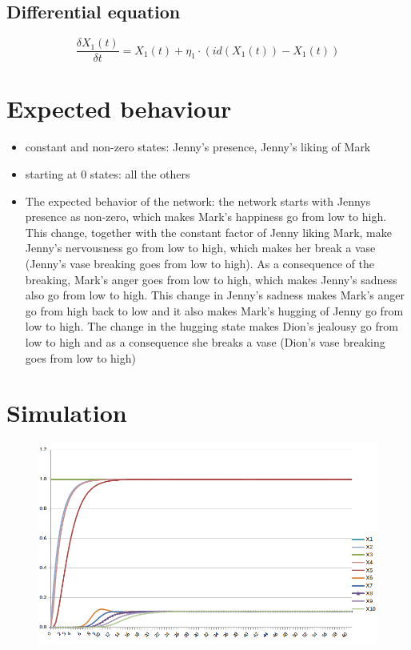 \documentclass[a4paper]{article}
\begin{document}
\subsection{Differential equation}

\begin{equation}
\frac{\delta X_{1}(t)}{\delta t} = X_{1}(t) + \eta_{1} \cdot ( id(X_{1}(t)) - X_{1}(t))
\end{equation}

\section{Expected behaviour}
 \begin{itemize}
\item constant and non-zero states:  Jenny's presence, Jenny's liking of Mark
\item starting at 0 states: all the others
\item The expected behavior of the network: the network starts with Jenny\textquotesingle s presence as non-zero, which makes Mark's happiness go from low to high. This change, together with the constant factor of Jenny liking Mark, make Jenny's nervousness go from low to high, which makes her break a vase (Jenny's vase breaking goes from low to high). As a consequence of the breaking, Mark's anger goes from low to high, which makes Jenny's sadness also go from low to high. This change in Jenny's sadness makes Mark's anger go from high back to low and it also makes Mark's hugging of Jenny go from low to high. The change in the hugging state makes Dion's jealousy go from low to high and as a consequence she breaks a vase (Dion's vase breaking goes from low to high)
\end{itemize}





\section{Simulation}

\begin{figure}[!htbp]
\center
\includegraphics[width=\textwidth]{res/img/numerical_representation}
\end{figure}




\end{document}
